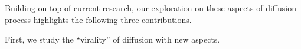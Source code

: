 \documentclass[phd,tocprelim]{cornell}
\begin{document}


Building on top of current research, our exploration on these aspects of diffusion process highlights the following three contributions.



First, we study the ``virality'' of diffusion with new aspects. 
\end{document}
